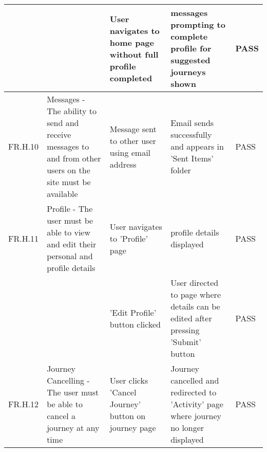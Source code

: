 \documentclass[11pt]{article}
\begin{document}
\begin{longtable}{|p{1.5cm}|p{3cm}|p{1.5cm}|p{2cm}|l|}
\cline{3-5}
 & & User navigates to home page without full profile completed & messages prompting to complete profile for suggested journeys shown & PASS \\
\hline
FR.H.10 & Messages - The ability to send and receive messages to and from other users on the site must be available & Message sent to other user using email address & Email sends successfully and appears in 'Sent Items' folder & PASS \\
\hline
FR.H.11 & Profile - The user must be able to view and edit their personal and profile details & User navigates to 'Profile' page & profile details displayed & PASS \\
\cline{3-5}
 & & 'Edit Profile' button clicked & User directed to page where details can be edited after pressing 'Submit' button & PASS \\ 
\hline
FR.H.12 & Journey Cancelling - The user must be able to cancel a journey at any time & User clicks 'Cancel Journey' button on journey page & Journey cancelled and redirected to 'Activity' page where journey no longer displayed & PASS \\
\hline
\end{longtable}
\end{document}
